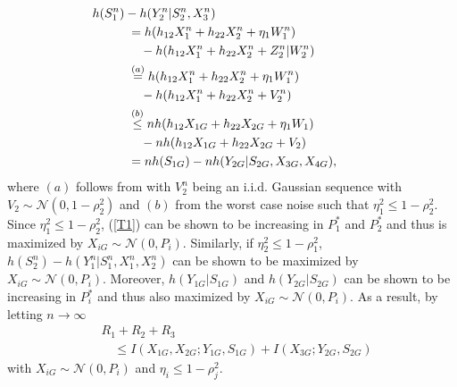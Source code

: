 \documentclass[10pt,conference]{IEEEtran}
\begin{document}
\begin{appendices}
\begin{align}
&\hspace{-1cm}h(S_1^n)-h(Y_2^n|S_2^n,X_3^n)\nonumber\\
&=h(h_{12}X_1^n+h_{22}X_2^n+\eta_1W_1^n)\nonumber\\
&\quad-h(h_{12}X_1^n+h_{22}X_2^n+Z_2^n|W_2^n)\\
&\stackrel{(a)}{=}h(h_{12}X_1^n+h_{22}X_2^n+\eta_1W_1^n)\nonumber\\
&\quad-h(h_{12}X_1^n+h_{22}X_2^n+V_2^n)\\
&\stackrel{(b)}{\leq}nh(h_{12}X_{1G}+h_{22}X_{2G}+\eta_1W_1)\nonumber\\
&\quad-nh(h_{12}X_{1G}+h_{22}X_{2G}+V_2)\\
\label{T1}
&=nh(S_{1G})-nh(Y_{2G}|S_{2G},X_{3G},X_{4G}),
\end{align}
where $(a)$ follows from \cite[Lemma 6]{AnnapureddyVeeravalli} with $V_2^n$ being an i.i.d. Gaussian sequence with $V_2\sim\mathcal{N}(0,1-\rho_2^2)$ and $(b)$ from the worst case noise \cite{DiggaviCover} such that $\eta_1^2\leq 1-\rho_2^2$. Since $\eta_1^2\leq1-\rho_2^2$, (\ref{T1}) can be shown to be increasing in $P_1^*$ and $P_2^*$ and thus is maximized by $X_{iG}\sim\mathcal{N}(0,P_i)$. Similarly, if $\eta_2^2\leq1-\rho_1^2$, $h(S_2^n)-h(Y_1^n|S_1^n,X_1^n,X_2^n)$ can be shown to be maximized by $X_{iG}\sim\mathcal{N}(0,P_i)$. Moreover, $h(Y_{1G}|S_{1G})$ and $h(Y_{2G}|S_{2G})$ can be shown to be increasing in $P_i^*$ and thus also maximized by $X_{iG}\sim\mathcal{N}(0,P_i)$. As a result, by letting $n\to\infty$
\begin{align}
\label{SumRate_n}
&R_1+R_2+R_3\nonumber\\
&\quad\leq I(X_{1G},X_{2G};Y_{1G},S_{1G})+I(X_{3G};Y_{2G},S_{2G})
\end{align}
with $X_{iG}\sim\mathcal{N}(0,P_i)$ and $\eta_i\leq1-\rho_j^2$.



\end{appendices}
\end{document}
